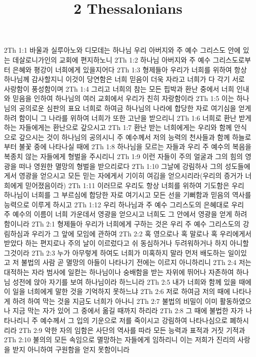 

\title{2 Thessalonians}

2Th 1:1  바울과 실루아노와 디모데는 하나님 우리 아버지와 주 예수 그리스도 안에 있는 데살로니가인의 교회에 편지하노니
2Th 1:2  하나님 아버지와 주 예수 그리스도로부터 은혜와 평강이 너희에게 있을지어다
2Th 1:3  형제들아 우리가 너희를 위하여 항상 하나님께 감사할지니 이것이 당연함은 너희 믿음이 더욱 자라고 너희가 다 각기 서로 사랑함이 풍성함이며
2Th 1:4  그리고 너희의 참는 모든 핍박과 환난 중에서 너희 인내와 믿음을 인하여 하나님의 여러 교회에서 우리가 친히 자랑함이라
2Th 1:5  이는 하나님의 공의로운 심판의 표요 너희로 하여금 하나님의 나라에 합당한 자로 여기심을 얻게 하려 함이니 그 나라를 위하여 너희가 또한 고난을 받으리니
2Th 1:6  너희로 환난 받게 하는 자들에게는 환난으로 갚으시고
2Th 1:7  환난 받는 너희에게는 우리와 함께 안식으로 갚으시는 것이 하나님의 공의시니 주 예수께서 저의 능력의 천사들과 함께 하늘로부터 불꽃 중에 나타나실 때에
2Th 1:8  하나님을 모르는 자들과 우리 주 예수의 복음을 복종치 않는 자들에게 형벌을 주시리니
2Th 1:9  이런 자들이 주의 얼굴과 그의 힘의 영광을 떠나 영원한 멸망의 형벌을 받으리로다
2Th 1:10  그날에 강림하사 그의 성도들에게서 영광을 얻으시고 모든 믿는 자에게서 기이히 여김을 얻으시리라(우리의 증거가 너희에게 믿어졌음이라)
2Th 1:11  이러므로 우리도 항상 너희를 위하여 기도함은 우리 하나님이 너희를 그 부르심에 합당한 자로 여기시고 모든 선을 기뻐함과 믿음의 역사를 능력으로 이루게 하시고
2Th 1:12  우리 하나님과 주 예수 그리스도의 은혜대로 우리 주 예수의 이름이 너희 가운데서 영광을 얻으시고 너희도 그 안에서 영광을 얻게 하려 함이니라
2Th 2:1  형제들아 우리가 너희에게 구하는 것은 우리 주 예수 그리스도의 강림하심과 우리가 그 앞에 모임에 관하여
2Th 2:2  혹 영으로나 혹 말로나 혹 우리에게서 받았다 하는 편지로나 주의 날이 이르렀다고 쉬 동심하거나 두려워하거나 하지 아니할 그것이라
2Th 2:3  누가 아무렇게 하여도 너희가 미혹하지 말라 먼저 배도하는 일이있고 저 불법의 사람 곧 멸망의 아들이 나타나기 전에는 이르지 아니하리니
2Th 2:4  저는 대적하는 자라 범사에 일컫는 하나님이나 숭배함을 받는 자위에 뛰어나 자존하여 하나님 성전에 앉아 자기를 보여 하나님이라 하느니라
2Th 2:5  내가 너희와 함께 있을 때에 이 일을 너희에게 말한 것을 기억하지 못하느냐
2Th 2:6  저로 하여금 저의 때에 나타나게 하려 하여 막는 것을 지금도 너희가 아나니
2Th 2:7  불법의 비밀이 이미 활동하였으나 지금 막는 자가 있어 그 중에서 옮길 때까지 하리라
2Th 2:8  그 때에 불법한 자가 나타나리니 주 예수께서 그 입의 기운으로 저를 죽이시고 강림하여 나타나심으로 폐하시리라
2Th 2:9  악한 자의 임함은 사단의 역사를 따라 모든 능력과 표적과 거짓 기적과
2Th 2:10  불의의 모든 속임으로 멸망하는 자들에게 임하리니 이는 저희가 진리의 사랑을 받지 아니하여 구원함을 얻지 못함이니라
